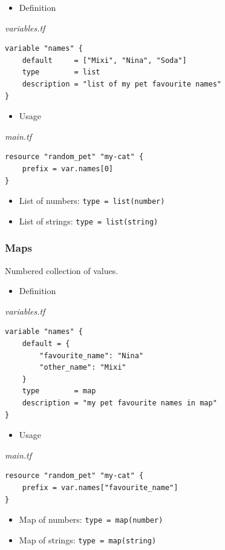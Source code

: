 \documentclass{article}
\newenvironment{codetemplate}[1][]{%
  \mybasecolorbox[#1]
  \itshape
}{%
  \endmybasecolorbox
}
\begin{document}
\begin{itemize}
    \item Definition
\end{itemize}
\begin{codetemplate}{variables.tf}
\begin{verbatim}
variable "names" {
    default     = ["Mixi", "Nina", "Soda"]
    type        = list
    description = "list of my pet favourite names"
}
\end{verbatim}
\end{codetemplate}
\begin{itemize}
    \item Usage
\end{itemize}
\begin{codetemplate}{main.tf}
\begin{verbatim}
resource "random_pet" "my-cat" {
    prefix = var.names[0]
}
\end{verbatim}
\end{codetemplate}
\begin{itemize}
    \item List of numbers: \verb+type = list(number)+
    \item List of strings: \verb+type = list(string)+
\end{itemize}

\subsubsection{Maps}
Numbered collection of values.

\begin{itemize}
    \item Definition
\end{itemize}
\begin{codetemplate}{variables.tf}
\begin{verbatim}
variable "names" {
    default = {
        "favourite_name": "Nina"
        "other_name": "Mixi"
    }
    type        = map
    description = "my pet favourite names in map"
}
\end{verbatim}
\end{codetemplate}
\begin{itemize}
    \item Usage
\end{itemize}
\begin{codetemplate}{main.tf}
\begin{verbatim}
resource "random_pet" "my-cat" {
    prefix = var.names["favourite_name"]
}
\end{verbatim}
\end{codetemplate}
\begin{itemize}
    \item Map of numbers: \verb+type = map(number)+
    \item Map of strings: \verb+type = map(string)+
\end{itemize}
\end{document}
